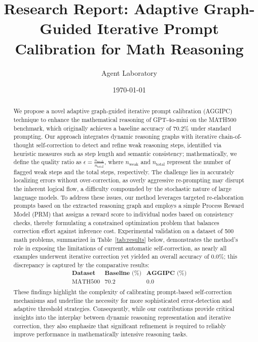 \documentclass[11pt]{article}
\title{Research Report: Adaptive Graph-Guided Iterative Prompt Calibration for Math Reasoning}
\author{Agent Laboratory}
\date{\today}
\begin{document}
\maketitle

\begin{abstract}
We propose a novel adaptive graph-guided iterative prompt calibration (AGGIPC) technique to enhance the mathematical reasoning of GPT-4o-mini on the MATH500 benchmark, which originally achieves a baseline accuracy of 70.2\% under standard prompting. Our approach integrates dynamic reasoning graphs with iterative chain-of-thought self-correction to detect and refine weak reasoning steps, identified via heuristic measures such as step length and semantic consistency; mathematically, we define the quality ratio as $\epsilon = \frac{n_{\text{weak}}}{n_{\text{total}}}$, where $n_{\text{weak}}$ and $n_{\text{total}}$ represent the number of flagged weak steps and the total steps, respectively. The challenge lies in accurately localizing errors without over-correction, as overly aggressive re-prompting may disrupt the inherent logical flow, a difficulty compounded by the stochastic nature of large language models. To address these issues, our method leverages targeted re-elaboration prompts based on the extracted reasoning graph and employs a simple Process Reward Model (PRM) that assigns a reward score to individual nodes based on consistency checks, thereby formulating a constrained optimization problem that balances correction effort against inference cost. Experimental validation on a dataset of 500 math problems, summarized in Table~\ref{tab:results} below, demonstrates the method's role in exposing the limitations of current automatic self-correction, as nearly all examples underwent iterative correction yet yielded an overall accuracy of 0.0\%; this discrepancy is captured by the comparative results: 
\[
\begin{array}{lcc}
\textbf{Dataset} & \textbf{Baseline (\%)} & \textbf{AGGIPC (\%)} \\ \hline
\text{MATH500} & 70.2 & 0.0 \\
\end{array}
\]
These findings highlight the complexity of calibrating prompt-based self-correction mechanisms and underline the necessity for more sophisticated error-detection and adaptive threshold strategies. Consequently, while our contributions provide critical insights into the interplay between dynamic reasoning representation and iterative correction, they also emphasize that significant refinement is required to reliably improve performance in mathematically intensive reasoning tasks.
\end{abstract}
\end{document}
